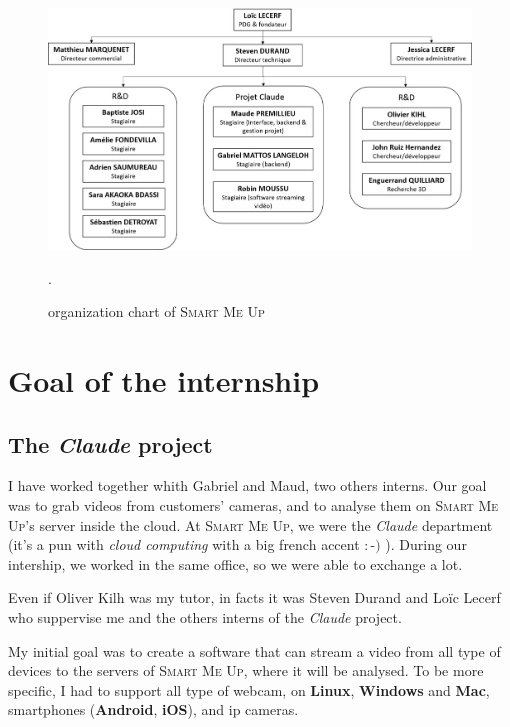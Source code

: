 \documentclass[a4paper,11pt]{custom}
\newcommand{\smu}{\textsc{Smart Me Up}}
\newcommand{\linux}{\textbf{Linux}\xspace}
\newcommand{\win}{\textbf{Windows}\xspace}
\newcommand{\mac}{\textbf{Mac}\xspace}
\newcommand{\android}{\textbf{Android}\xspace}
\newcommand{\ios}{\textbf{iOS}\xspace}
\newcommand{\claude}{\textit{Claude}\xspace}
\begin{document}
\begin{figure}
  \centering
  \def\svgwidth{\columnwidth}
  \includegraphics[width=\textwidth]{organigramme.jpg}
  \label{fig:organigramme}
  \caption{organization chart of \smu}.
\end{figure}

\chapter{Goal of the internship}

\section{The \claude{} project}

I have worked together whith Gabriel and Maud, two others interns. Our goal was
to grab videos from customers' cameras, and to analyse them on \smu's server
inside the cloud. At \smu, we were the \claude{} department (it's a pun with
\textit{cloud computing} with a big french accent $:$-$)$ ). During our
intership, we worked in the same office, so we were able to exchange a lot.

Even if Oliver Kilh was my tutor, in facts it was Steven Durand and Loïc Lecerf
who suppervise me and the others interns of the \claude{} project.

My initial goal was to create a software that can stream a video from all type of
devices to the servers of \smu, where it will be analysed. To be more specific,
I had to support all type of webcam, on \linux, \win{} and \mac, smartphones
(\android, \ios), and ip cameras.
\end{document}
